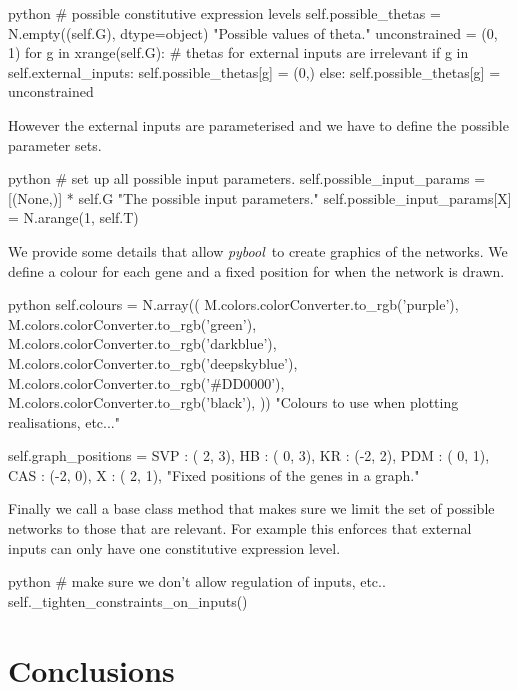 \documentclass{article}
\newcommand{\pybool}{\emph{pybool}}
\begin{document}
\begin{pygmented}{python}
        # possible constitutive expression levels
        self.possible_thetas = N.empty((self.G), dtype=object)
        "Possible values of theta."
        unconstrained = (0, 1)
        for g in xrange(self.G):
            # thetas for external inputs are irrelevant
            if g in self.external_inputs:
                self.possible_thetas[g] = (0,)
            else:
                self.possible_thetas[g] = unconstrained
\end{pygmented}
However the external inputs are parameterised and we have to define the possible parameter sets.
\begin{pygmented}{python}
        # set up all possible input parameters.
        self.possible_input_params = [(None,)] * self.G
        "The possible input parameters."
        self.possible_input_params[X] = N.arange(1, self.T)
\end{pygmented}
We provide some details that allow \pybool\ to create graphics of the networks. We define a colour for each gene and a fixed position for when the network is drawn.
\begin{pygmented}{python}
        self.colours = N.array((
            M.colors.colorConverter.to_rgb('purple'),
            M.colors.colorConverter.to_rgb('green'),
            M.colors.colorConverter.to_rgb('darkblue'),
            M.colors.colorConverter.to_rgb('deepskyblue'),
            M.colors.colorConverter.to_rgb('#DD0000'),
            M.colors.colorConverter.to_rgb('black'),
        ))
        "Colours to use when plotting realisations, etc..."

        self.graph_positions = {
            SVP : ( 2, 3),
             HB : ( 0, 3),
             KR : (-2, 2),
            PDM : ( 0, 1),
            CAS : (-2, 0),
              X : ( 2, 1),
        }
        "Fixed positions of the genes in a graph."
\end{pygmented}
Finally we call a base class method that makes sure we limit the set of possible networks to those that are relevant. For example this enforces that external inputs can only have one constitutive expression level.
\begin{pygmented}{python}
        # make sure we don't allow regulation of inputs, etc..
        self._tighten_constraints_on_inputs()
\end{pygmented}




\section{Conclusions}
\end{document}
